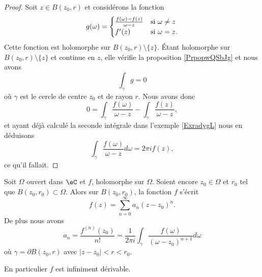 \begin{proof}
    Soit \( z\in B(z_0,r)\) et considérons la fonction
    \begin{equation}
        g(\omega)=\begin{cases}
            \frac{ f(\omega)-f(z) }{ \omega-z }    &   \text{si \( \omega\neq z\)}\\
            f'(z)    &    \text{si \( \omega=z\)}.
        \end{cases}
    \end{equation}
    Cette fonction est holomorphe sur \( B(z_0,r)\setminus\{ z \}\). Étant holomorphe sur \( B(z_0,r)\setminus\{ z \}\) et continue en \( z\), elle vérifie la proposition \ref{PrpopwQSbJg} et nous avons
    \begin{equation}
        \int_{\gamma}g=0
    \end{equation}
    où \( \gamma\) est le cercle de centre \( z_0\) et de rayon \( r\). Nous avons donc
    \begin{equation}
        0=\int_{\gamma}\frac{ f(\omega) }{ \omega-z }-\int_{\gamma}\frac{ f(z) }{ \omega-z },
    \end{equation}
    et ayant déjà calculé la seconde intégrale dans l'exemple \ref{ExradygL} nous en déduisons
    \begin{equation}
        \int_{\gamma}\frac{ f(\omega) }{ \omega-z }d\omega=2\pi if(z),
    \end{equation}
    ce qu'il fallait.
\end{proof}


\begin{theorem}     \label{ThomcPOdd}
    Soit \( \Omega\) ouvert dans \( \eC\) et \( f\), holomorphe sur \( \Omega\). Soient encore \( z_0\in \Omega\) et \( r_0\) tel que \( B(z_0,r_0)\subset \Omega\). Alors sur \( B(z_0,r_0)\), la fonction \( f\) s'écrit
    \begin{equation}
        f(z)=\sum_{n=0}^{\infty}a_n(z-z_0)^n.
    \end{equation}
    De plus nous avons
    \begin{equation}
        a_n=\frac{ f^{(n)}(z_0) }{ n! }=\frac{1}{ 2\pi i }\int_{\gamma}\frac{ f(\omega) }{ (\omega-z_0)^{n+1} }d\omega
    \end{equation}
    où \( \gamma=\partial B(z_0,r)\) avec \( | z-z_0 |<r<r_0\).

    En particulier \( f\) est infiniment dérivable.
\end{theorem}

